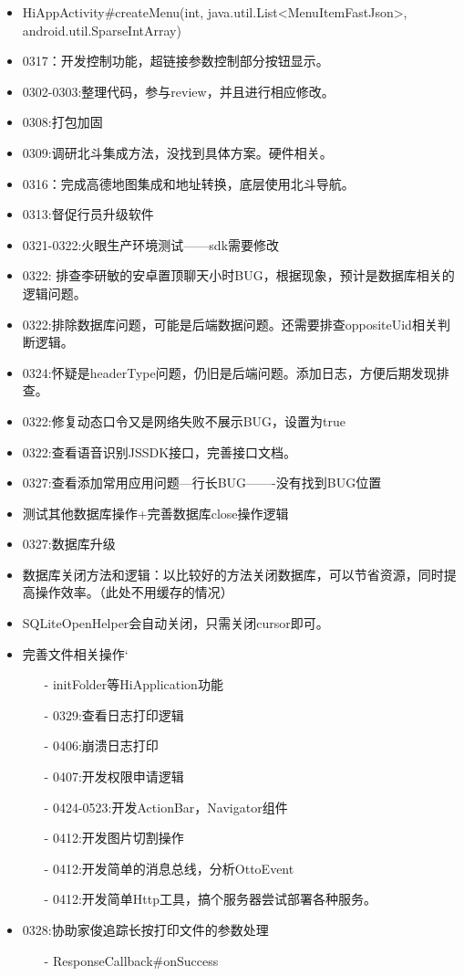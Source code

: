 \documentclass[12pt,a4paper]{ctexart}
\begin{document}
\begin{itemize}
		\item HiAppActivity\#createMenu(int, java.util.List<MenuItemFastJson>, android.util.SparseIntArray)
		\item 0317：开发控制功能，超链接参数控制部分按钮显示。
		\item 0302-0303:整理代码，参与review，并且进行相应修改。
		\item 0308:打包加固
		\item 0309:调研北斗集成方法，没找到具体方案。硬件相关。
		\item 0316：完成高德地图集成和地址转换，底层使用北斗导航。
		\item 0313:督促行员升级软件
		\item 0321-0322:火眼生产环境测试——sdk需要修改
		\item 0322: 排查李研敏的安卓置顶聊天小时BUG，根据现象，预计是数据库相关的逻辑问题。
		\item 0322:排除数据库问题，可能是后端数据问题。还需要排查oppositeUid相关判断逻辑。
		\item 0324:怀疑是headerType问题，仍旧是后端问题。添加日志，方便后期发现排查。
		\item 0322:修复动态口令又是网络失败不展示BUG，设置为true
		\item 0322:查看语音识别JSSDK接口，完善接口文档。
		\item 0327:查看添加常用应用问题—行长BUG-------没有找到BUG位置
		\item 测试其他数据库操作+完善数据库close操作逻辑
		\item 0327:数据库升级
		\item 数据库关闭方法和逻辑：以比较好的方法关闭数据库，可以节省资源，同时提高操作效率。（此处不用缓存的情况）
		\item SQLiteOpenHelper会自动关闭，只需关闭cursor即可。
		\item 完善文件相关操作‘
		\begin{itemize}
			\item[-] initFolder等HiApplication功能
			\item[-] 0329:查看日志打印逻辑
			\item[-] 0406:崩溃日志打印
			\item[-] 0407:开发权限申请逻辑
			\item[-] 0424-0523:开发ActionBar，Navigator组件
			\item[-] 0412:开发图片切割操作
			\item[-] 0412:开发简单的消息总线，分析OttoEvent
			\item[-] 0412:开发简单Http工具，搞个服务器尝试部署各种服务。
		\end{itemize}
		\item 0328:协助家俊追踪长按打印文件的参数处理
		\begin{itemize}
			\item[-] ResponseCallback\#onSuccess
		\end{itemize}
		

\end{itemize}
\end{document}
